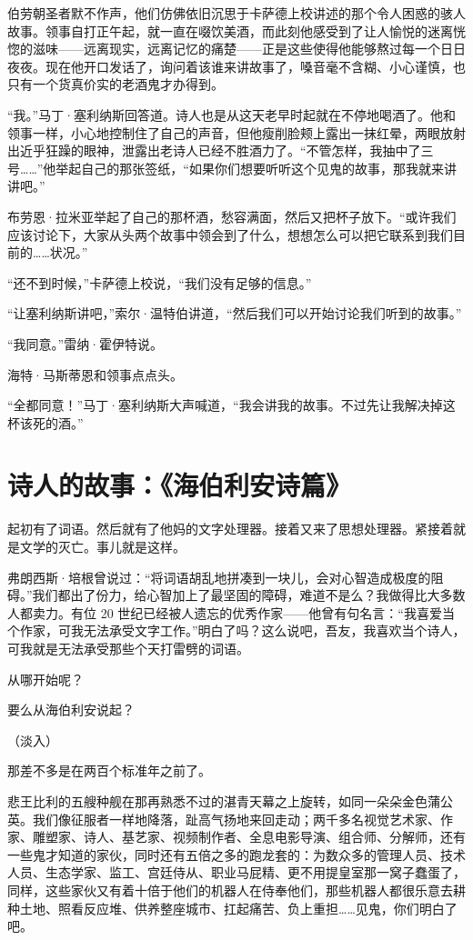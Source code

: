 \documentclass[AutoFakeBold=true]{book}
\begin{document}
伯劳朝圣者默不作声，他们仿佛依旧沉思于卡萨德上校讲述的那个令人困惑的骇人故事。领事自打正午起，就一直在啜饮美酒，而此刻他感受到了让人愉悦的迷离恍惚的滋味——远离现实，远离记忆的痛楚——正是这些使得他能够熬过每一个日日夜夜。现在他开口发话了，询问着该谁来讲故事了，嗓音毫不含糊、小心谨慎，也只有一个货真价实的老酒鬼才办得到。

``我。''马丁·塞利纳斯回答道。诗人也是从这天老早时起就在不停地喝酒了。他和领事一样，小心地控制住了自己的声音，但他瘦削脸颊上露出一抹红晕，两眼放射出近乎狂躁的眼神，泄露出老诗人已经不胜酒力了。``不管怎样，我抽中了三号……''他举起自己的那张签纸，``如果你们想要听听这个见鬼的故事，那我就来讲讲吧。''

布劳恩·拉米亚举起了自己的那杯酒，愁容满面，然后又把杯子放下。``或许我们应该讨论下，大家从头两个故事中领会到了什么，想想怎么可以把它联系到我们目前的……状况。''

``还不到时候，''卡萨德上校说，``我们没有足够的信息。''

``让塞利纳斯讲吧，''索尔·温特伯讲道，``然后我们可以开始讨论我们听到的故事。''

``我同意。''雷纳·霍伊特说。

海特·马斯蒂恩和领事点点头。

``全都同意！''马丁·塞利纳斯大声喊道，``我会讲我的故事。不过先让我解决掉这杯该死的酒。''

\section{诗人的故事：《海伯利安诗篇》}

起初有了词语。然后就有了他妈的文字处理器。接着又来了思想处理器。紧接着就是文学的灭亡。事儿就是这样。

弗朗西斯·培根曾说过：``将词语胡乱地拼凑到一块儿，会对心智造成极度的阻碍。''我们都出了份力，给心智加上了最坚固的障碍，难道不是么？我做得比大多数人都卖力。有位 20 世纪已经被人遗忘的优秀作家——他曾有句名言：``我喜爱当个作家，可我无法承受文字工作。''明白了吗？这么说吧，吾友，我喜欢当个诗人，可我就是无法承受那些个天打雷劈的词语。

从哪开始呢？

要么从海伯利安说起？

（淡入）

那差不多是在两百个标准年之前了。

悲王比利的五艘种舰在那再熟悉不过的湛青天幕之上旋转，如同一朵朵金色蒲公英。我们像征服者一样地降落，趾高气扬地来回走动；两千多名视觉艺术家、作家、雕塑家、诗人、基艺家、视频制作者、全息电影导演、组合师、分解师，还有一些鬼才知道的家伙，同时还有五倍之多的跑龙套的：为数众多的管理人员、技术人员、生态学家、监工、宫廷侍从、职业马屁精、更不用提皇室那一窝子蠢蛋了，同样，这些家伙又有着十倍于他们的机器人在侍奉他们，那些机器人都很乐意去耕种土地、照看反应堆、供养整座城市、扛起痛苦、负上重担……见鬼，你们明白了吧。
\end{document}

